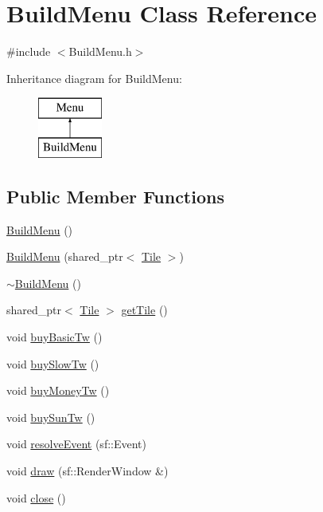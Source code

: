 \hypertarget{class_build_menu}{\section{Build\+Menu Class Reference}
\label{class_build_menu}
}


{\ttfamily \#include $<$Build\+Menu.\+h$>$}

Inheritance diagram for Build\+Menu\+:\begin{figure}[H]
\begin{center}
\leavevmode
\includegraphics[height=2.000000cm]{class_build_menu}
\end{center}
\end{figure}
\subsection*{Public Member Functions}
\begin{DoxyCompactItemize}
\item 
\hyperlink{class_build_menu_acdbc901d204a90638bf17e71e4215311}{Build\+Menu} ()
\item 
\hyperlink{class_build_menu_ad63b1ba9611f30feb9446668566b0aa4}{Build\+Menu} (shared\+\_\+ptr$<$ \hyperlink{class_tile}{Tile} $>$)
\item 
\hyperlink{class_build_menu_a3683fde835c95da534d3bcbad731f6c8}{$\sim$\+Build\+Menu} ()
\item 
shared\+\_\+ptr$<$ \hyperlink{class_tile}{Tile} $>$ \hyperlink{class_build_menu_a5f4c9ee77c787c60468fe8c224637dfc}{get\+Tile} ()
\item 
void \hyperlink{class_build_menu_a769c90e895773e03cf3f12214ffde3e5}{buy\+Basic\+Tw} ()
\item 
void \hyperlink{class_build_menu_aba60e635a3ba452995e194bf3bd63304}{buy\+Slow\+Tw} ()
\item 
void \hyperlink{class_build_menu_a0608c73be6f0130d0bd827189572a702}{buy\+Money\+Tw} ()
\item 
void \hyperlink{class_build_menu_a0ad03076763bc89e1c2f855e448b9f61}{buy\+Sun\+Tw} ()
\item 
void \hyperlink{class_build_menu_a2d044954ea1713a15048630e104c7d2a}{resolve\+Event} (sf\+::\+Event)
\item 
void \hyperlink{class_build_menu_acbedc91d2b9c5ecf3d429612b95543a5}{draw} (sf\+::\+Render\+Window \&)
\item 
void \hyperlink{class_build_menu_a58efd17837e0cd60a9bd1852cf6eaadd}{close} ()
\end{DoxyCompactItemize}
